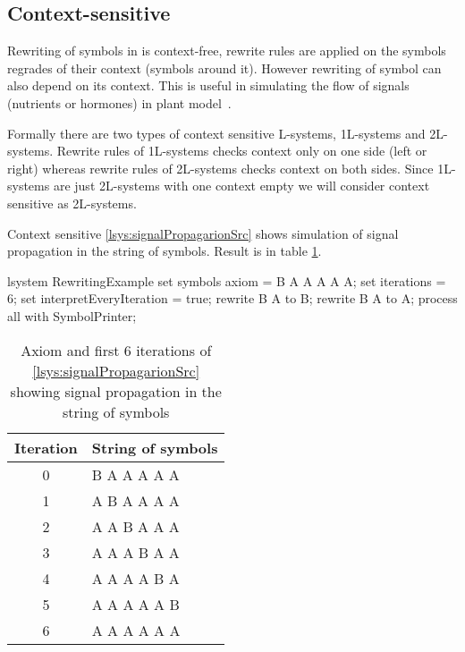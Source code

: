 \subsection{Context-sensitive \lsystems}

\newcommand{\onelsystems}{\mbox{1L-systems}\xspace}
\newcommand{\twolsystems}{\mbox{2L-systems}\xspace}

Rewriting of symbols in \zerolsystems is context-free, rewrite rules are applied on the symbols regrades of their context (symbols around it).
However rewriting of symbol can also depend on its context.
This is useful in simulating the flow of signals (nutrients or hormones) in plant model~\citep{PL91}.

Formally there are two types of context sensitive L-systems, \onelsystems and \twolsystems.
Rewrite rules of \onelsystems checks context only on one side (left or right) whereas rewrite rules of \twolsystems checks context on both sides.
Since \onelsystems are just \twolsystems with one context empty we will consider context sensitive \lsystems as \twolsystems.

Context sensitive \lsystem \ref{lsys:signalPropagarionSrc} shows simulation of signal propagation in the string of symbols.
Result is in table \ref{fig:signalPropagarion}.

\begin{Lsystem}[label=lsys:signalPropagarionSrc,caption={Context-sensitive \lsystems simulating signal propagation}]
lsystem RewritingExample {
	set symbols axiom = B A A A A A;
	set iterations = 6;
	set interpretEveryIteration = true;
	rewrite {B} A     to B;
	rewrite     B {A} to A;
}
process all with SymbolPrinter;
\end{Lsystem}

\begin{table}[ht]
	\centering
	\begin{tabular}{c l}
   		\toprule
   		Iteration & String of symbols \\
   		\midrule
		0 & B A A A A A \\
		1 & A B A A A A \\
		2 & A A B A A A \\
		3 & A A A B A A \\
		4 & A A A A B A \\
		5 & A A A A A B \\
		6 & A A A A A A \\
		\bottomrule
	\end{tabular}
	\caption{Axiom and first 6 iterations of \lsystem \ref{lsys:signalPropagarionSrc} showing signal propagation in the string of symbols}
	\label{fig:signalPropagarion}
\end{table}


